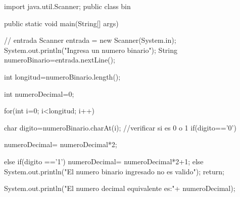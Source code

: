 import java.util.Scanner;
public class bin {

    public static void main(String[] args) {
        // entrada
        Scanner entrada = new Scanner(System.in);
        System.out.println("Ingresa un numero binario");
        String numeroBinario=entrada.nextLine();
        
        int longitud=numeroBinario.length();
        
        int numeroDecimal=0;
        
        for(int i=0; i<longitud; i++){
            char digito=numeroBinario.charAt(i);
            //verificar si es 0 o 1
            if(digito=='0'){
                numeroDecimal= numeroDecimal*2;
                
            
            }else if(digito =='1'){
                numeroDecimal= numeroDecimal*2+1;
            }else{
                System.out.println("El numero binario ingresado no es valido");
                return;
            }
        }
        System.out.println("El numero decimal equivalente es:"+ numeroDecimal);
    }
}